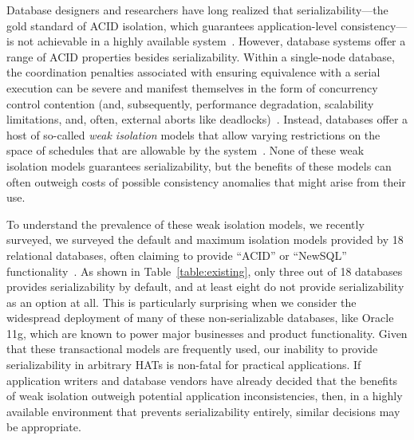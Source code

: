 Database designers and researchers have long realized that
serializability---the gold standard of ACID isolation, which
guarantees application-level consistency---is not achievable in a
highly available system~\cite{davidson-survey}.  However, database
systems offer a range of ACID properties besides
serializability. Within a single-node database, the coordination
penalties associated with ensuring equivalence with a serial execution
can be severe and manifest themselves in the form of concurrency
control contention (and, subsequently, performance degradation,
scalability limitations, and, often, external aborts like
deadlocks)~\cite{gray-isolation}. Instead, databases offer a host of
so-called \textit{weak isolation} models that allow varying
restrictions on the space of schedules that are allowable by the
system~\cite{adya}. None of these weak isolation models guarantees
serializability, but the benefits of these models can often outweigh
costs of possible consistency anomalies that might arise
from their use.

To understand the prevalence of these weak isolation models, we
recently surveyed, we surveyed the default and maximum isolation
models provided by 18 relational databases, often claiming to provide
``ACID'' or ``NewSQL'' functionality~\cite{hat-hotos}. As shown in
Table~\ref{table:existing}, only three out of 18 databases provides
serializability by default, and at least eight do not provide
serializability as an option at all. This is particularly surprising
when we consider the widespread deployment of many of these
non-serializable databases, like Oracle 11g, which are known to power
major businesses and product functionality. Given that these
transactional models are frequently used, our inability to provide
serializability in arbitrary HATs is non-fatal for practical
applications. If application writers and database vendors have already
decided that the benefits of weak isolation outweigh potential
application inconsistencies, then, in a highly available environment
that prevents serializability entirely, similar decisions may be
appropriate.

